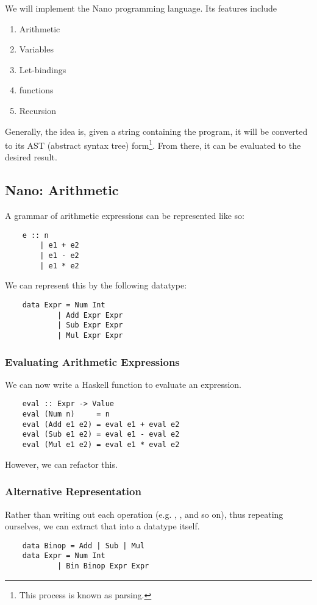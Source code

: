 \documentclass[letterpaper]{article}
\begin{document}
\bigskip 

We will implement the Nano programming language. Its features include
\begin{enumerate}
    \item Arithmetic
    \item Variables
    \item Let-bindings
    \item functions
    \item Recursion
\end{enumerate}
Generally, the idea is, given a string containing the program, it will be converted to its AST (abstract syntax tree) form\footnote{This process is known as parsing.}. From there, it can be evaluated to the desired result. 

\subsection{Nano: Arithmetic}
A grammar of arithmetic expressions can be represented like so: 
\begin{verbatim}
    e :: n 
        | e1 + e2 
        | e1 - e2 
        | e1 * e2\end{verbatim}
We can represent this by the following datatype: 
\begin{verbatim}
    data Expr = Num Int 
            | Add Expr Expr 
            | Sub Expr Expr 
            | Mul Expr Expr\end{verbatim}

\subsubsection{Evaluating Arithmetic Expressions}
We can now write a Haskell function to evaluate an expression. 
\begin{verbatim}
    eval :: Expr -> Value
    eval (Num n)     = n
    eval (Add e1 e2) = eval e1 + eval e2
    eval (Sub e1 e2) = eval e1 - eval e2
    eval (Mul e1 e2) = eval e1 * eval e2\end{verbatim}
However, we can refactor this. 

\subsubsection{Alternative Representation}
Rather than writing out each operation (e.g. , , and so on), thus repeating ourselves, we can extract that into a datatype itself.
\begin{verbatim}
    data Binop = Add | Sub | Mul 
    data Expr = Num Int 
            | Bin Binop Expr Expr \end{verbatim}
\end{document}
